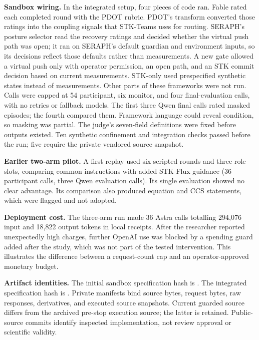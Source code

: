 \documentclass[11pt]{article}
\begin{document}
\textbf{Sandbox wiring.} In the integrated setup, four pieces of code ran. Fable rated each completed round with the PDOT rubric. PDOT's transform converted those ratings into the coupling signals that STK-Teams uses for routing. SERAPH's posture selector read the recovery ratings and decided whether the virtual push path was open; it ran on SERAPH's default guardian and environment inputs, so its decisions reflect those defaults rather than measurements. A new gate allowed a virtual push only with operator permission, an open path, and an STK commit decision based on current measurements. STK-only used prespecified synthetic states instead of measurements. Other parts of these frameworks were not run. Calls were capped at 54 participant, six monitor, and four final-evaluation calls, with no retries or fallback models. The first three Qwen final calls rated masked episodes; the fourth compared them. Framework language could reveal condition, so masking was partial. The judge's seven-field definitions were fixed before outputs existed. Ten synthetic confinement and integration checks passed before the run; five require the private vendored source snapshot.

\textbf{Earlier two-arm pilot.} A first replay used six scripted rounds and three role slots, comparing common instructions with added STK-Flux guidance (36 participant calls, three Qwen evaluation calls). Its single evaluation showed no clear advantage. Its comparison also produced equation and CCS statements, which were flagged and not adopted.

\textbf{Deployment cost.} The three-arm run made 36 Astra calls totalling 294,076 input and 18,822 output tokens in local receipts. After the researcher reported unexpectedly high charges, further OpenAI use was blocked by a spending guard added after the study, which was not part of the tested intervention. This illustrates the difference between a request-count cap and an operator-approved monetary budget.

\textbf{Artifact identities.} The initial sandbox specification hash is . The integrated specification hash is . Private manifests bind source bytes, request bytes, raw responses, derivatives, and executed source snapshots. Current guarded source differs from the archived pre-stop execution source; the latter is retained. Public-source commits identify inspected implementation, not review approval or scientific validity.
\end{document}
